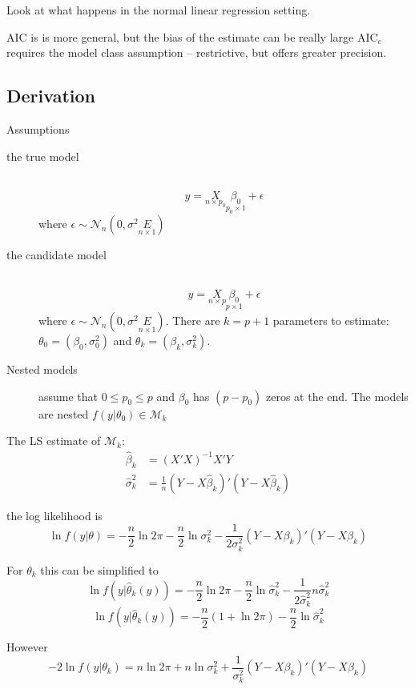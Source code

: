 \documentclass[a4paper]{article}
\newcommand{\brac}[1]{{\left ( #1 \right )}}
\newcommand{\induc}[1]{{\left . #1 \right \vert}}
\newcommand{\Mcal}{\mathcal{M}}
\newcommand{\Ncal}{\mathcal{N}}
\begin{document}
Look at what happens in the normal linear regression setting.

AIC is is more general, but the bias of the estimate can be really large
$\text{AIC}_c$ requires the model class assumption -- restrictive, but offers greater precision.

\subsection{Derivation} %
\label{sub:derivation}
Assumptions \begin{description}
	\item[the true model]\hfill\\
	\[y = \underset{n\times p_0}{X}\underset{p_0\times 1}{\beta_0} + \epsilon\]
	where $\epsilon \sim \Ncal_n\brac{0,\sigma^2 \underset{n\times 1}{E}}$
	\item[the candidate model] \hfill\\
	\[y = \underset{n\times p}{X}\underset{p\times 1}{\beta_0} + \epsilon\]
	where $\epsilon \sim \Ncal_n\brac{0,\sigma^2 \underset{n\times 1}{E}}$.
	There are $k=p+1$ parameters to estimate: $\theta_0 = \brac{\beta_0,\sigma_0^2}$ and $\theta_k = \brac{\beta_k,\sigma_k^2}$.
	\item[Nested models] assume that $0\leq p_0 \leq p$ and $\beta_0$ has $(p-p_0)$ zeros at the end. The models are nested $f\brac{\induc{y}\theta_0}\in \Mcal_k$
\end{description}

The LS estimate of $\Mcal_k$:\begin{align*}
	\hat{\beta}_k &= \brac{X'X}^{-1} X'Y\\
	\hat{\sigma}^2_k &= \frac{1}{n}\brac{Y-X\hat{\beta}_k}'\brac{Y-X\hat{\beta}_k}
\end{align*}


the log likelihood is 
\[\ln f\brac{\induc{y}\theta} = -\frac{n}{2} \ln 2\pi -\frac{n}{2}\ln \sigma^2_k - \frac{1}{2\sigma^2_k} \brac{Y-X\beta_k}'\brac{Y-X\beta_k}\]

For $\theta_k$ this can be simplified to 
\[\ln f\brac{\induc{y}\hat{\theta}_k(y)} = -\frac{n}{2} \ln 2\pi -\frac{n}{2}\ln \hat{\sigma}^2_k - \frac{1}{2\hat{\sigma}^2_k} n \hat{\sigma}^2_k \]
\[\ln f\brac{\induc{y}\hat{\theta}_k(y)} = -\frac{n}{2} \brac{ 1 + \ln 2\pi} -\frac{n}{2}\ln \hat{\sigma}^2_k\]

However
\[-2\ln f\brac{\induc{y}\theta_k} = n \ln 2\pi +n\ln \sigma^2_k + \frac{1}{\sigma^2_k} \brac{Y-X\beta_k}'\brac{Y-X\beta_k}\]
\end{document}
